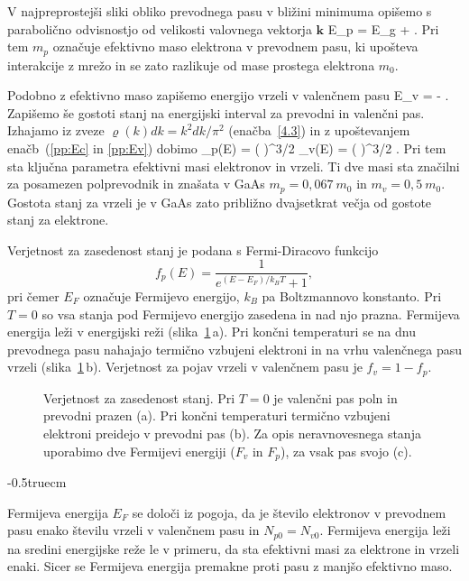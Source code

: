 V najpreprostejši sliki obliko prevodnega pasu v bližini minimuma opišemo 
s parabolično odvisnostjo od velikosti valovnega vektorja $\mathbf{k}$
\beq
E_p = E_g + .
\label{pp:Ec}
\eeq
Pri tem $m_p$ označuje efektivno maso elektrona v prevodnem pasu, ki upošteva
interakcije z mrežo in se zato razlikuje od mase prostega elektrona $m_0$.

Podobno z efektivno maso zapišemo energijo vrzeli v valenčnem pasu
\beq
E_v = - .
\label{pp:Ev}
\eeq
Zapišemo še gostoti stanj na energijski interval za prevodni in valenčni pas. Izhajamo iz zveze
$\varrho(k) dk = k^2dk /\pi^2$ (enačba~\ref{4.3}) in z upoštevanjem 
enačb~(\ref{pp:Ec} in \ref{pp:Ev}) dobimo
\beq
\varrho_p(E) = \left( \right)^{3/2} 
\qquad {}\qquad
\varrho_v(E) = \left( \right)^{3/2} .
\label{eq:rho_p}
\eeq
Pri tem sta ključna parametra efektivni masi 
elektronov in vrzeli. Ti dve masi sta značilni za posamezen polprevodnik
in znašata v GaAs $m_p = 0,067~m_0$ in $m_v = 0,5~m_0$. 
Gostota stanj za vrzeli je v GaAs zato približno 
dvajsetkrat večja od gostote stanj za elektrone.

Verjetnost za zasedenost stanj je podana s Fermi-Diracovo funkcijo 
\begin{equation}  
f_p(E)=\frac{1}{e^{(E-E_F)/k_B T}+1},
\label{eq:7FD}
\end{equation}
pri čemer $E_F$ označuje Fermijevo energijo, $k_B$ pa Boltzmannovo konstanto. 
Pri $T=0$ so vsa stanja pod 
Fermijevo energijo zasedena in nad njo prazna. Fermijeva energija leži
v energijski reži (slika~\ref{fig:Fermi}\,a). Pri končni temperaturi se na dnu prevodnega pasu nahajajo 
termično vzbujeni elektroni in na vrhu valenčnega pasu vrzeli (slika~\ref{fig:Fermi}\,b). Verjetnost 
za pojav vrzeli v valenčnem pasu je $f_v = 1 - f_p$.
\begin{figure}[ht]
\centering
\def\svgwidth{145truemm} 

\caption{Verjetnost za zasedenost stanj. Pri $T=0$ je valenčni pas poln in prevodni prazen (a).
Pri končni temperaturi termično vzbujeni elektroni preidejo v prevodni pas (b). Za opis neravnovesnega
stanja uporabimo dve Fermijevi energiji ($F_v$ in $F_p$), za vsak pas svojo (c).
}
\label{fig:Fermi}
\end{figure}
\vglue-0.5truecm
\begin{remark}
Fermijeva energija $E_F$ se določi iz pogoja, da je število elektronov v prevodnem pasu enako 
številu vrzeli v valenčnem pasu in $N_{p0} = N_{v0}$. Fermijeva energija
leži na sredini energijske reže le v primeru, da sta efektivni masi 
za elektrone in vrzeli enaki. Sicer se Fermijeva energija premakne
proti pasu z manjšo efektivno maso. 
\end{remark}

